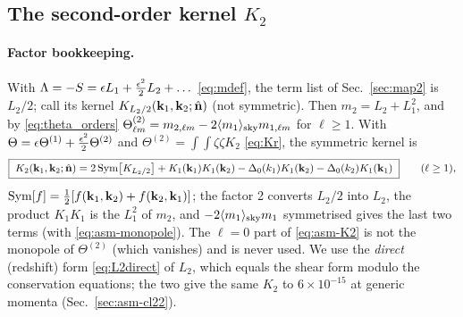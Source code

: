 \subsection{The second-order kernel \texorpdfstring{$K_2$}{K2}}
\label{sec:asm-K2}
\paragraph{Factor bookkeeping.}  With $\Lambda=-S=\epsilon L_1+\tfrac{\epsilon^2}2L_2+\dots$ \eqref{eq:mdef}, the term list of
Sec.~\ref{sec:map2} is $L_2/2$; call its kernel $K_{L_2/2}(\mathbf k_1,\mathbf k_2;\hat{\mathbf n})$ (not symmetric).  Then
$m_2=L_2+L_1^2$, and by \eqref{eq:theta_orders} $\Theta^{(2)}_{\ell m}=m_{2,\ell m}-2\langle m_1\rangle_{\rm sky}m_{1,\ell m}$ for $\ell\ge1$.  With
$\Theta=\epsilon\Theta^{(1)}+\tfrac{\epsilon^2}2\Theta^{(2)}$ and $\Theta^{(2)}=\int\!\!\int\zeta\zeta K_2$ \eqref{eq:Kr}, the symmetric kernel is
\begin{equation}
\boxed{\;K_2(\mathbf k_1,\mathbf k_2;\hat{\mathbf n})=2\,{\rm Sym}\big[K_{L_2/2}\big]+K_1(\mathbf k_1)K_1(\mathbf k_2)-\Delta_0(k_1)K_1(\mathbf k_2)-\Delta_0(k_2)K_1(\mathbf k_1)\;}
\qquad(\ell\ge1),
\label{eq:asm-K2}
\end{equation}
${\rm Sym}[f]=\tfrac12[f(\mathbf k_1,\mathbf k_2)+f(\mathbf k_2,\mathbf k_1)]$; the factor 2 converts $L_2/2$ into $L_2$, the product $K_1K_1$ is the $L_1^2$ of $m_2$,
and $-2\langle m_1\rangle_{\rm sky}m_1$ symmetrised gives the last two terms (with \eqref{eq:asm-monopole}).  The $\ell=0$ part of \eqref{eq:asm-K2} is
not the monopole of $\Theta^{(2)}$ (which vanishes) and is never used.  We use the \emph{direct} (redshift) form \eqref{eq:L2direct} of $L_2$, which equals
the shear form modulo the conservation equations; the two give the same $K_2$ to $6\times10^{-15}$ at generic momenta
(Sec.~\ref{sec:asm-cl22}).

